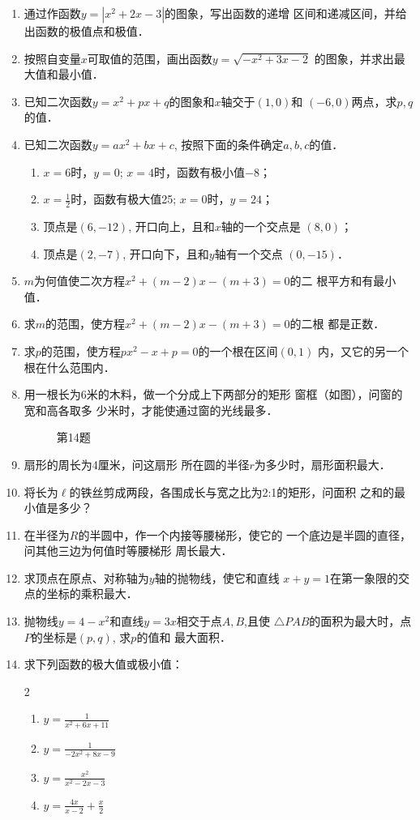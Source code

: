 \begin{enumerate}
\item 通过作函数$y=|x^2+2x-3|$的图象，写出函数的递增
区间和递减区间，并给出函数的极值点和极值．
\item 按照自变量$x$可取值的范围，画出函数$y=\sqrt{-x^2+3x-2}$
的图象，并求出最大值和最小值．
\item 已知二次函数$y=x^2+px+q$的图象和$x$轴交于$(1,0)$和
$(-6,0)$两点，求$p,q$的值．
\item 已知二次函数$y=ax^2+bx+c$, 按照下面的条件确定$a,
b,c$的值．
\begin{enumerate}
\item $x=6$时，$y=0$; $x=4$时，函数有极小值$-8$；
\item $x=\frac{1}{2}$时，函数有极大值25; $x=0$时，$y=24$；
\item 顶点是$(6,-12)$, 开口向上，且和$x$轴的一个交点是
$(8,0)$；
\item 顶点是$(2,-7)$, 开口向下，且和$y$轴有一个交点
$(0,-15)$．
\end{enumerate}

\item  $m$为何值使二次方程$x^2+(m-2)x-(m+3)=0$的二
根平方和有最小值．
\item 求$m$的范围，使方程$x^2+(m-2)x-(m+3)=0$的二根
都是正数．
\item  求$p$的范围，使方程$px^2-x+p=0$的一个根在区间$(0,1)$
内，又它的另一个根在什么范围内．
\item 用一根长为6米的木料，做一个分成上下两部分的矩形
窗框（如图），问窗的宽和高各取多
少米时，才能使通过窗的光线最多．
\begin{figure}[htp]
    \centering
    \caption{第14题}
\end{figure}

\item 扇形的周长为4厘米，问这扇形
所在圆的半径$r$为多少时，扇形面积最大．
\item 将长为$\ell$的铁丝剪成两段，各围成长与宽之比为2:1的矩形，问面积
之和的最小值是多少？
\item 在半径为$R$的半圆中，作一个内接等腰梯形，使它的
一个底边是半圆的直径，问其他三边为何值时等腰梯形
周长最大．
\item 求顶点在原点、对称轴为$y$轴的抛物线，使它和直线
$x+y=1$在第一象限的交点的坐标的乘积最大．
\item 抛物线$y=4-x^2$和直线$y=3x$相交于点$A,B$,且使
$\triangle PAB$的面积为最大时，点$P$的坐标是$(p,q)$, 求$p$的值和
最大面积．
\item 求下列函数的极大值或极小值：
\begin{multicols}{2}
\begin{enumerate}
    \item $y=\frac{1}{x^2+6x+11}$
    \item $y=\frac{1}{-2x^2+8x-9}$
    \item $y=\frac{x^2}{x^2-2x-3}$
    \item $y=\frac{4x}{x-2}+\frac{x}{2}$
\end{enumerate}
\end{multicols}


\end{enumerate}
